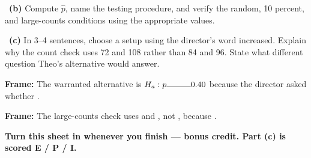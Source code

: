 \documentclass[11pt]{article}
\begin{document}
~\textbf{(b)} Compute $\hat p$, name the testing procedure, and verify the random, 10 percent, and large-counts conditions using the appropriate values.\par
\workspace{1.4in}

~\textbf{(c)} In 3--4 sentences, choose a setup using the director's word increased. Explain why the count check uses 72 and 108 rather than 84 and 96. State what different question Theo's alternative would answer.\par
\workspace{2.0in}

\begin{sentenceframebox}\raggedright\textbf{Frame:} The warranted alternative is $H_a:p\blank[0.4in]0.40$ because the director asked whether \blank[2.2in].\end{sentenceframebox}

\begin{sentenceframebox}\raggedright\textbf{Frame:} The large-counts check uses \blank[0.8in] and \blank[0.8in], not \blank[1.0in], because \blank[2.4in].\end{sentenceframebox}

\textbf{Turn this sheet in whenever you finish --- bonus credit. Part (c) is scored E / P / I.}\par
\end{document}
